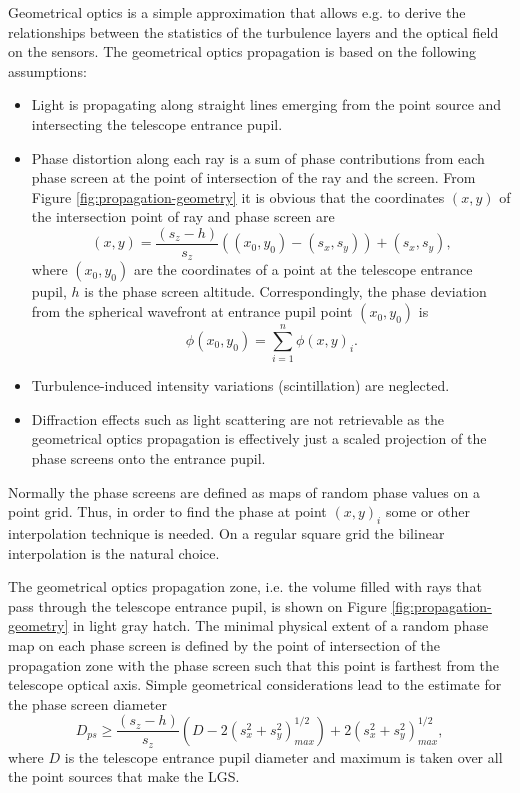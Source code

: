 Geometrical optics is a simple approximation that allows e.g. to derive the
relationships between the statistics of the turbulence layers and the optical
field on the sensors.
The geometrical optics propagation is based on the following assumptions:
\begin{itemize}
  \item Light is propagating along straight lines emerging from the point
  source and intersecting the telescope entrance pupil.
  \item Phase distortion along each ray is a sum of phase contributions from each
  phase screen at the point of intersection of the ray and the screen. From
  Figure \ref{fig:propagation-geometry} it is obvious that the coordinates
  $(x,y)$ of the intersection point of ray and phase screen are
  \begin{equation} \label{eq:ray-screen-intersection}
    (x,y) = \frac{(s_{z}-h)}{s_{z}} ( (x_{0},y_{0})-(s_{x},s_{y})
    )+(s_{x},s_{y}),
  \end{equation}
  where $(x_{0},y_{0})$ are the coordinates of a point at the telescope
  entrance pupil, $h$ is the phase screen altitude. Correspondingly, the phase
  deviation from the spherical wavefront at entrance pupil point
  $(x_{0},y_{0})$ is
  \begin{equation} \label{eq:eq:geometrical-phase-deviation}
    \phi (x_{0},y_{0}) = \sum_{i=1}^{n} \phi (x,y)_{i}.
  \end{equation}
  \item Turbulence-induced intensity variations (scintillation) are neglected.
  \item Diffraction effects such as light scattering are not retrievable as
  the geometrical optics propagation is effectively just a scaled projection of
  the phase screens onto the entrance pupil.
\end{itemize}
Normally the phase screens are defined as maps of random phase values on a
point grid. Thus, in order to find the phase at point $(x,y)_{i}$ some or
other interpolation technique is needed. On a regular square grid the bilinear
interpolation is the natural choice.

The geometrical optics propagation zone, i.e. the volume filled with rays that
pass through the telescope entrance pupil, is shown on Figure
\ref{fig:propagation-geometry} in light gray hatch. The minimal physical extent
of a random phase map on each phase screen is defined by the point of
intersection of the propagation zone with the phase screen such that this
point is farthest from the telescope optical axis. Simple geometrical
considerations lead to the estimate for the phase screen diameter
\begin{equation} \label{eq:geometrical-screen-size}
  D_{ps} \geq \frac{(s_{z}-h)}{s_{z}}
  ( D - 2 (s_{x}^{2}+s_{y}^{2})^{1/2}_{max} ) +
  2(s_{x}^{2}+s_{y}^{2})^{1/2}_{max},
\end{equation}
where $D$ is the telescope entrance pupil diameter and maximum is taken over
all the point sources that make the LGS.

